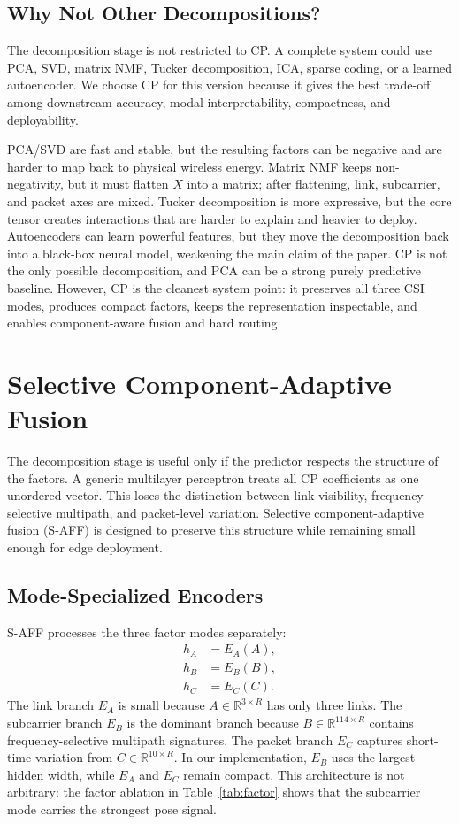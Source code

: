 \documentclass[10pt,conference]{IEEEtran}
\begin{document}
\subsection{Why Not Other Decompositions?}

The decomposition stage is not restricted to CP. A complete system could use PCA, SVD, matrix NMF, Tucker decomposition, ICA, sparse coding, or a learned autoencoder. We choose CP for this version because it gives the best trade-off among downstream accuracy, modal interpretability, compactness, and deployability.

PCA/SVD are fast and stable, but the resulting factors can be negative and are harder to map back to physical wireless energy. Matrix NMF keeps non-negativity, but it must flatten $X$ into a matrix; after flattening, link, subcarrier, and packet axes are mixed. Tucker decomposition is more expressive, but the core tensor creates interactions that are harder to explain and heavier to deploy. Autoencoders can learn powerful features, but they move the decomposition back into a black-box neural model, weakening the main claim of the paper. CP is not the only possible decomposition, and PCA can be a strong purely predictive baseline. However, CP is the cleanest system point: it preserves all three CSI modes, produces compact factors, keeps the representation inspectable, and enables component-aware fusion and hard routing.

\section{Selective Component-Adaptive Fusion}

The decomposition stage is useful only if the predictor respects the structure of the factors. A generic multilayer perceptron treats all CP coefficients as one unordered vector. This loses the distinction between link visibility, frequency-selective multipath, and packet-level variation. Selective component-adaptive fusion (S-AFF) is designed to preserve this structure while remaining small enough for edge deployment.

\subsection{Mode-Specialized Encoders}

S-AFF processes the three factor modes separately:
\begin{align}
h_A &= E_A(A),\\
h_B &= E_B(B),\\
h_C &= E_C(C).
\end{align}
The link branch $E_A$ is small because $A\in\mathbb{R}^{3\times R}$ has only three links. The subcarrier branch $E_B$ is the dominant branch because $B\in\mathbb{R}^{114\times R}$ contains frequency-selective multipath signatures. The packet branch $E_C$ captures short-time variation from $C\in\mathbb{R}^{10\times R}$. In our implementation, $E_B$ uses the largest hidden width, while $E_A$ and $E_C$ remain compact. This architecture is not arbitrary: the factor ablation in Table~\ref{tab:factor} shows that the subcarrier mode carries the strongest pose signal.
\end{document}
